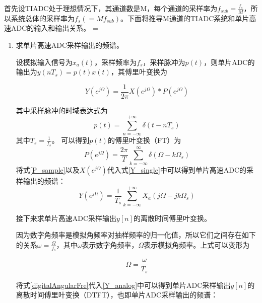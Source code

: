 	
	首先设TIADC处于理想情况下，其通道数是M，每个通道的采样率为$f_{sub}=\frac{f_s}{M}$，所以系统总体的采样率为$f_s(=Mf_{sub})$。下面将推导M通道的TIADC系统和单片高速ADC的输入和输出关系。
	=	\par
	\begin{enumerate}
		\item 求单片高速ADC采样输出的频谱。\par
			设模拟输入信号为${x_a}(t)$，采样频率为$f_s$，采样脉冲为$p(t)$，则单片ADC的输出为$y(nT_s)=p(t)x(t)$，其傅里叶变换为
		
			\begin{equation}
				Y\left( {{e^{j\Omega }}} \right) = \frac{1}{{2\pi }}X\left( {{e^{j\Omega }}} \right)*P\left( {{e^{j\Omega }}} \right)\label{Y_single}
			\end{equation}

			其中采样脉冲的时域表达式为
			\begin{equation}
				p(t) = \sum\limits_{n =  - \infty }^{ + \infty } {\delta (t - n{T_s})} 			
			\end{equation}
			其中$T_s=\frac{1}{f_s}$。
			可以得到$p(t)$的傅里叶变换（FT）为
			\begin{equation}
				P\left( {{e^{j\Omega }}} \right) = \frac{{2\pi }}{T}\sum\limits_{k =  - \infty }^\infty  {\delta \left( {\Omega  - k{\Omega _s}} \right)}  \label{P_sample}
			\end{equation}
		将式\ref{P_sample}以及$X(e^{j\Omega })$代入式\ref{Y_single}中可以得到单片高速ADC的采样输出的频谱：
			\begin{equation}
				Y\left( {{e^{j\Omega }}} \right) = \frac{1}{{{T_s}}}\sum\limits_{k =  - \infty }^{ + \infty } {{X_a}\left( {j\Omega  - jk{\Omega _s}} \right)}  \label{Y_analog}
			\end{equation}
			
			接下来求单片高速ADC采样输出$y[n]$的离散时间傅里叶变换。\par			因为数字角频率是模拟角频率对抽样频率的归一化值，所以它们之间存在如下的关系$\omega = \frac{\Omega }{f_s}$，其中$\omega$表示数字角频率，$\Omega$表示模拟角频率。上式可以变形为
			
				\begin{equation}
					\Omega = \frac{\omega }{T_s} \label{digitalAngularFre}
				\end{equation}
				
			将式\ref{digitalAngularFre}代入\ref{Y_analog}中可以得到单片ADC采样输出$y[n]$的离散时间傅里叶变换（DTFT），也即单片ADC采样输出的频谱：
			

\end{enumerate}
